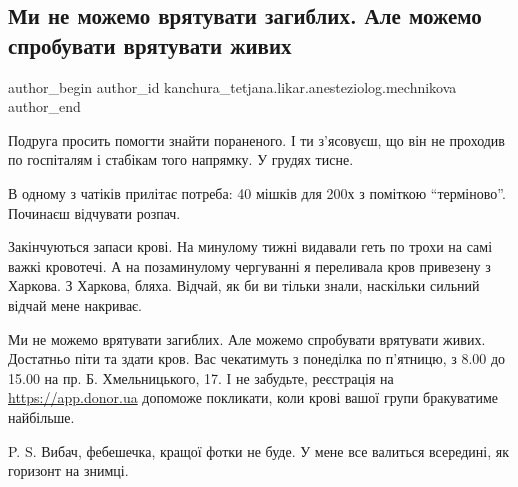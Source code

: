  
 
 
 
 

\subsection{Ми не можемо врятувати загиблих. Але можемо спробувати врятувати живих}
\label{sec:13_01_2023.fb.kanchura_tetjana.likar.anesteziolog.mechnikova.1.mi_ne_mozhemo_vryatu}

\ifcmt
 author_begin
   author_id kanchura_tetjana.likar.anesteziolog.mechnikova
 author_end
\fi

Подруга просить помогти знайти пораненого. І ти з'ясовуєш, що він не проходив
по госпіталям і стабікам того напрямку. У грудях тисне.

В одному з чатіків прилітає потреба: 40 мішків для 200х з поміткою \enquote{терміново}.
Починаєш відчувати розпач.

Закінчуються запаси крові. На минулому тижні видавали геть по трохи на самі
важкі кровотечі. А на позаминулому чергуванні я переливала кров привезену з
Харкова. З Харкова, бляха. Відчай, як би ви тільки знали, наскільки сильний
відчай мене накриває.

Ми не можемо врятувати загиблих. Але можемо спробувати врятувати живих.
Достатньо піти та здати кров. Вас чекатимуть з понеділка по п'ятницю, з 8.00 до
15.00 на пр. Б. Хмельницького, 17. І не забудьте, реєстрація на
\url{https://app.donor.ua} допоможе покликати, коли крові вашої групи бракуватиме
найбільше. 

P. S. Вибач, фебешечка, кращої фотки не буде. У мене все валиться всередині, як
горизонт на знимці.
